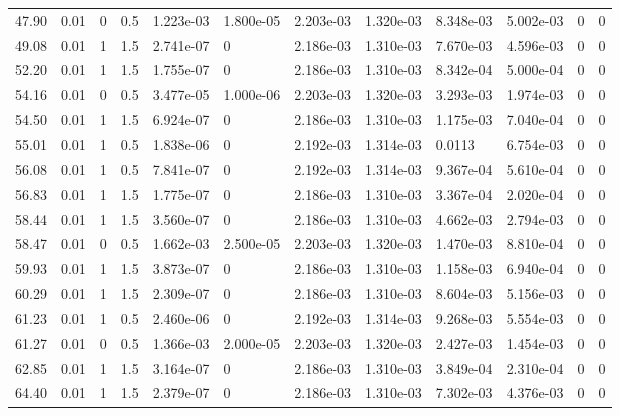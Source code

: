 \documentclass[preview]{standalone}
\begin{document}
{{\begin{tabular}{L{1.2cm}C{1.2cm} C{0.3cm}C{0.5cm} C{1.4cm}C{1.4cm} C{1.4cm}C{1.4cm} C{1.6cm}C{1.6cm} C{1.6cm}C{1.6cm}}
  47.90  &  0.01  & 0     & 0.5 &  1.223e-03  & 1.800e-05  &  2.203e-03&   1.320e-03& 8.348e-03 & 5.002e-03   &  0 & 0  \\ 
  49.08  &  0.01  & 1     & 1.5 &  2.741e-07  & 0  &  2.186e-03&   1.310e-03& 7.670e-03 & 4.596e-03   &  0 & 0  \\ 
  52.20  &  0.01  & 1     & 1.5 &  1.755e-07  & 0  &  2.186e-03&   1.310e-03& 8.342e-04 & 5.000e-04   &  0 & 0  \\ 
  54.16  &  0.01  & 0     & 0.5 &  3.477e-05  & 1.000e-06  &  2.203e-03&   1.320e-03& 3.293e-03 & 1.974e-03   &  0 & 0  \\ 
  54.50  &  0.01  & 1     & 1.5 &  6.924e-07  & 0  &  2.186e-03&   1.310e-03& 1.175e-03 & 7.040e-04   &  0 & 0  \\ 
  55.01  &  0.01  & 1     & 0.5 &  1.838e-06  & 0  &  2.192e-03&   1.314e-03& 0.0113 & 6.754e-03   &  0 & 0  \\ 
  56.08  &  0.01  & 1     & 0.5 &  7.841e-07  & 0  &  2.192e-03&   1.314e-03& 9.367e-04 & 5.610e-04   &  0 & 0  \\ 
  56.83  &  0.01  & 1     & 1.5 &  1.775e-07  & 0  &  2.186e-03&   1.310e-03& 3.367e-04 & 2.020e-04   &  0 & 0  \\ 
  58.44  &  0.01  & 1     & 1.5 &  3.560e-07  & 0  &  2.186e-03&   1.310e-03& 4.662e-03 & 2.794e-03   &  0 & 0  \\ 
  58.47  &  0.01  & 0     & 0.5 &  1.662e-03  & 2.500e-05  &  2.203e-03&   1.320e-03& 1.470e-03 & 8.810e-04   &  0 & 0  \\ 
  59.93  &  0.01  & 1     & 1.5 &  3.873e-07  & 0  &  2.186e-03&   1.310e-03& 1.158e-03 & 6.940e-04   &  0 & 0  \\ 
  60.29  &  0.01  & 1     & 1.5 &  2.309e-07  & 0  &  2.186e-03&   1.310e-03& 8.604e-03 & 5.156e-03   &  0 & 0  \\ 
  61.23  &  0.01  & 1     & 0.5 &  2.460e-06  & 0  &  2.192e-03&   1.314e-03& 9.268e-03 & 5.554e-03   &  0 & 0  \\ 
  61.27  &  0.01  & 0     & 0.5 &  1.366e-03  & 2.000e-05  &  2.203e-03&   1.320e-03& 2.427e-03 & 1.454e-03   &  0 & 0  \\ 
  62.85  &  0.01  & 1     & 1.5 &  3.164e-07  & 0  &  2.186e-03&   1.310e-03& 3.849e-04 & 2.310e-04   &  0 & 0  \\ 
  64.40  &  0.01  & 1     & 1.5 &  2.379e-07  & 0  &  2.186e-03&   1.310e-03& 7.302e-03 & 4.376e-03   &  0 & 0  \\ 
\hline 
\end{tabular} 

}}
\end{document}
